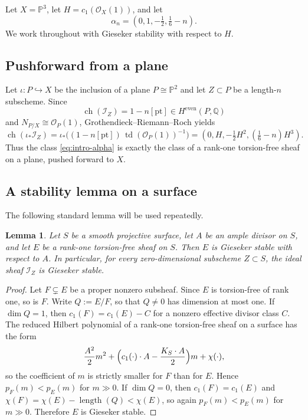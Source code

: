 \documentclass[12pt]{amsart}
\numberwithin{equation}{section}
\newcommand{\PP}{\mathbb{P}}
\newcommand{\Q}{\mathbb{Q}}
\newcommand{\OO}{\mathcal{O}}
\newcommand{\I}{\mathcal{I}}
\newcommand{\ch}{\operatorname{ch}}
\newcommand{\td}{\operatorname{td}}
\theoremstyle{plain}
\newtheorem{lemma}[theorem]{Lemma}
\theoremstyle{definition}
\theoremstyle{remark}
\begin{document}
Let $X=\PP^3$, let $H=c_1(\OO_X(1))$, and let
\[
\alpha_n=(0,1,-\tfrac12,\tfrac16-n).
\]
We work throughout with Gieseker stability with respect to $H$.

\subsection{Pushforward from a plane}
Let $\iota\colon P\hookrightarrow X$ be the inclusion of a plane $P\cong \PP^2$ and let $Z\subset P$ be a length-$n$ subscheme.
Since
\[
\ch(\I_Z)=1-n[\mathrm{pt}]\in H^{\mathrm{even}}(P,\Q)
\]
and $N_{P/X}\cong \OO_P(1)$, Grothendieck--Riemann--Roch yields
\begin{equation}\label{eq:grr-plane}
\ch(\iota_*\I_Z)=\iota_*\bigl((1-n[\mathrm{pt}])\,\td(\OO_P(1))^{-1}\bigr)
=(0,H,-\tfrac12H^2,(\tfrac16-n)H^3).
\end{equation}
Thus the class \eqref{eq:intro-alpha} is exactly the class of a rank-one torsion-free sheaf on a plane, pushed forward to $X$.

\subsection{A stability lemma on a surface}
The following standard lemma will be used repeatedly.

\begin{lemma}\label{lem:rank-one-stable}
Let $S$ be a smooth projective surface, let $A$ be an ample divisor on $S$, and let $E$ be a rank-one torsion-free sheaf on $S$.
Then $E$ is Gieseker stable with respect to $A$.
In particular, for every zero-dimensional subscheme $Z\subset S$, the ideal sheaf $\I_Z$ is Gieseker stable.
\end{lemma}

\begin{proof}
Let $F\subsetneq E$ be a proper nonzero subsheaf.
Since $E$ is torsion-free of rank one, so is $F$.
Write $Q:=E/F$, so that $Q\neq 0$ has dimension at most one.
If $\dim Q=1$, then $c_1(F)=c_1(E)-C$ for a nonzero effective divisor class $C$.
The reduced Hilbert polynomial of a rank-one torsion-free sheaf on a surface has the form
\[
\frac{A^2}{2}m^2+\Bigl(c_1(\cdot)\cdot A-\frac{K_S\cdot A}{2}\Bigr)m+\chi(\cdot),
\]
so the coefficient of $m$ is strictly smaller for $F$ than for $E$.
Hence $p_F(m)<p_E(m)$ for $m\gg 0$.
If $\dim Q=0$, then $c_1(F)=c_1(E)$ and $\chi(F)=\chi(E)-\operatorname{length}(Q)<\chi(E)$, so again $p_F(m)<p_E(m)$ for $m\gg 0$.
Therefore $E$ is Gieseker stable.
\end{proof}
\end{document}
